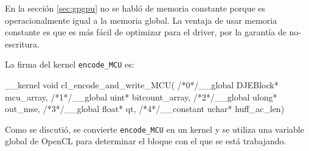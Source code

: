 En la sección \ref{sec:gpgpu} no se habló de memoria constante porque es
operacionalmente igual a la memoria global. La ventaja de usar memoria
constante es que es más fácil de optimizar para el driver, por la garantía de no-escritura.

La firma del kernel \verb+encode_MCU+ es:

\begin{code}[language=C][h]
__kernel void
cl_encode_and_write_MCU(
    /*0*/__global DJEBlock* mcu_array,
    /*1*/__global uint* bitcount_array,
    /*2*/__global ulong* out_mse,
    /*3*/__global float* qt,
    /*4*/__constant uchar* huff_ac_len)
\end{code}

Como se discutió, se convierte \verb+encode_MCU+ en un kernel y se utiliza una
variable global de OpenCL para determinar el bloque con el que se está
trabajando.

